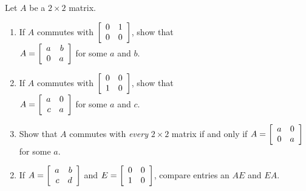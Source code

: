 \begin{multicols}{2}
\begin{ex}
Let $A$ be a $2 \times 2$ matrix.


\begin{enumerate}[label={\alph*.}]
\item If $A$ commutes with $\left[ \begin{array}{rr}
0 & 1 \\
0 & 0
\end{array} \right]$, show that \\ $A = \left[ \begin{array}{rr}
 a & b \\
 0 & a
 \end{array} \right]$
 for some $a$ and $b$.

\item If $A$ commutes with $\left[ \begin{array}{rr}
0 & 0 \\
1 & 0
\end{array} \right]$, show that \\ $A = \left[ \begin{array}{rr}
 a & 0 \\
 c & a
 \end{array} \right]$
 for some $a$ and $c$.

\item Show that $A$ commutes with \textit{every} $2 \times 2$ matrix \newline if and only if $A = \left[ \begin{array}{rr}
a & 0 \\
0 & a
\end{array} \right]$
 for some $a$.

\end{enumerate}
\begin{sol}
\begin{enumerate}[label={\alph*.}]
\setcounter{enumi}{1}
\item  If $A = \left[ \begin{array}{rr}
a & b \\
c & d
\end{array} \right]$
 and $E = \left[ \begin{array}{rr}
 0 & 0 \\
 1 & 0
 \end{array} \right]$, compare entries an $AE$ and $EA$.

\end{enumerate}
\end{sol}
\end{ex}


\end{multicols}
